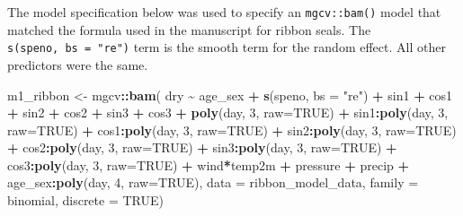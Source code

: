 \documentclass[fleqn,10pt,lineno]{wlpeerj} %
\newenvironment{Shaded}{\begin{snugshade}}{\end{snugshade}}
\newcommand{\AttributeTok}[1]{\textcolor[rgb]{0.13,0.29,0.53}{#1}}
\newcommand{\ConstantTok}[1]{\textcolor[rgb]{0.56,0.35,0.01}{#1}}
\newcommand{\DecValTok}[1]{\textcolor[rgb]{0.00,0.00,0.81}{#1}}
\newcommand{\FunctionTok}[1]{\textcolor[rgb]{0.13,0.29,0.53}{\textbf{#1}}}
\newcommand{\NormalTok}[1]{#1}
\newcommand{\OtherTok}[1]{\textcolor[rgb]{0.56,0.35,0.01}{#1}}
\newcommand{\SpecialCharTok}[1]{\textcolor[rgb]{0.81,0.36,0.00}{\textbf{#1}}}
\newcommand{\StringTok}[1]{\textcolor[rgb]{0.31,0.60,0.02}{#1}}
\begin{document}
The model specification below was used to specify an \texttt{mgcv::bam()} model that
matched the formula used in the manuscript for ribbon seals. The \texttt{s(speno,\ bs\ =\ "re")}
term is the smooth term for the random effect. All other predictors were
the same.

\begin{Shaded}
\begin{Highlighting}[]
\NormalTok{m1\_ribbon }\OtherTok{\textless{}{-}}\NormalTok{ mgcv}\SpecialCharTok{::}\FunctionTok{bam}\NormalTok{(}
\NormalTok{  dry }\SpecialCharTok{\textasciitilde{}}\NormalTok{ age\_sex }\SpecialCharTok{+} \FunctionTok{s}\NormalTok{(speno, }\AttributeTok{bs =} \StringTok{"re"}\NormalTok{) }\SpecialCharTok{+} 
\NormalTok{    sin1 }\SpecialCharTok{+}\NormalTok{ cos1 }\SpecialCharTok{+}\NormalTok{ sin2 }\SpecialCharTok{+}\NormalTok{ cos2 }\SpecialCharTok{+}\NormalTok{ sin3 }\SpecialCharTok{+}\NormalTok{ cos3 }\SpecialCharTok{+} 
    \FunctionTok{poly}\NormalTok{(day, }\DecValTok{3}\NormalTok{, }\AttributeTok{raw=}\ConstantTok{TRUE}\NormalTok{) }\SpecialCharTok{+} 
\NormalTok{    sin1}\SpecialCharTok{:}\FunctionTok{poly}\NormalTok{(day, }\DecValTok{3}\NormalTok{, }\AttributeTok{raw=}\ConstantTok{TRUE}\NormalTok{) }\SpecialCharTok{+}
\NormalTok{    cos1}\SpecialCharTok{:}\FunctionTok{poly}\NormalTok{(day, }\DecValTok{3}\NormalTok{, }\AttributeTok{raw=}\ConstantTok{TRUE}\NormalTok{) }\SpecialCharTok{+}
\NormalTok{    sin2}\SpecialCharTok{:}\FunctionTok{poly}\NormalTok{(day, }\DecValTok{3}\NormalTok{, }\AttributeTok{raw=}\ConstantTok{TRUE}\NormalTok{) }\SpecialCharTok{+}
\NormalTok{    cos2}\SpecialCharTok{:}\FunctionTok{poly}\NormalTok{(day, }\DecValTok{3}\NormalTok{, }\AttributeTok{raw=}\ConstantTok{TRUE}\NormalTok{) }\SpecialCharTok{+}
\NormalTok{    sin3}\SpecialCharTok{:}\FunctionTok{poly}\NormalTok{(day, }\DecValTok{3}\NormalTok{, }\AttributeTok{raw=}\ConstantTok{TRUE}\NormalTok{) }\SpecialCharTok{+}
\NormalTok{    cos3}\SpecialCharTok{:}\FunctionTok{poly}\NormalTok{(day, }\DecValTok{3}\NormalTok{, }\AttributeTok{raw=}\ConstantTok{TRUE}\NormalTok{) }\SpecialCharTok{+}
\NormalTok{    wind}\SpecialCharTok{*}\NormalTok{temp2m }\SpecialCharTok{+}\NormalTok{ pressure }\SpecialCharTok{+}\NormalTok{ precip }\SpecialCharTok{+} 
\NormalTok{    age\_sex}\SpecialCharTok{:}\FunctionTok{poly}\NormalTok{(day, }\DecValTok{4}\NormalTok{, }\AttributeTok{raw=}\ConstantTok{TRUE}\NormalTok{),}
  \AttributeTok{data =}\NormalTok{ ribbon\_model\_data,}
  \AttributeTok{family =}\NormalTok{ binomial,}
  \AttributeTok{discrete =} \ConstantTok{TRUE}\NormalTok{)}
\end{Highlighting}
\end{Shaded}
\end{document}
